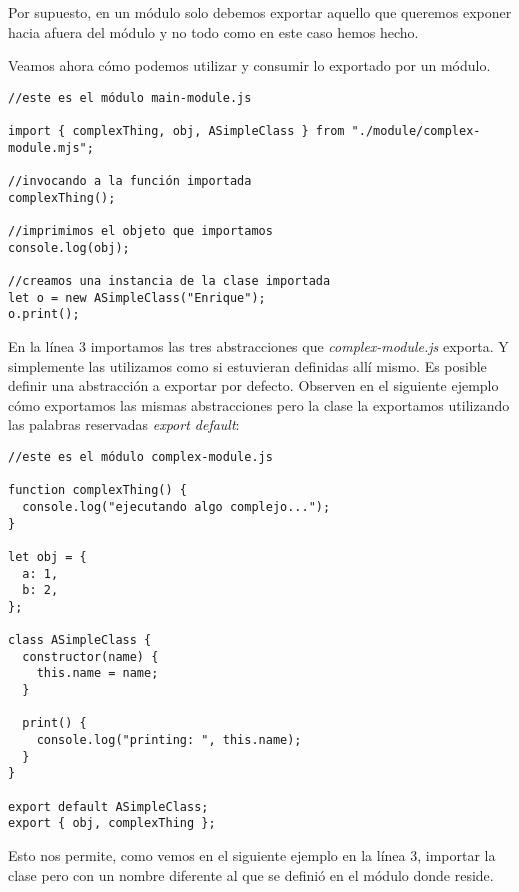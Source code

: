 \documentclass[a4paper, oneside, titlepage, 12pt]{paper}
\begin{document}
Por supuesto, en un módulo solo debemos exportar aquello que queremos exponer hacia afuera del módulo y no todo como en este caso hemos hecho. 	
\newline

Veamos ahora cómo podemos utilizar y consumir lo exportado por un módulo.

\begin{verbatim}
//este es el módulo main-module.js

import { complexThing, obj, ASimpleClass } from "./module/complex-module.mjs";

//invocando a la función importada
complexThing();

//imprimimos el objeto que importamos
console.log(obj);

//creamos una instancia de la clase importada
let o = new ASimpleClass("Enrique");
o.print();
\end{verbatim}

En la línea 3 importamos las tres abstracciones que \textit{complex-module.js} exporta. Y simplemente las utilizamos como si estuvieran definidas allí mismo. Es posible definir una abstracción a exportar por defecto. Observen en el siguiente ejemplo cómo exportamos las mismas abstracciones pero la clase la exportamos utilizando las palabras reservadas \textit{export default}:

\begin{verbatim}
//este es el módulo complex-module.js

function complexThing() {
  console.log("ejecutando algo complejo...");
}

let obj = {
  a: 1,
  b: 2,
};

class ASimpleClass {
  constructor(name) {
    this.name = name;
  }

  print() {
    console.log("printing: ", this.name);
  }
}

export default ASimpleClass;
export { obj, complexThing };
\end{verbatim}

Esto nos permite, como vemos en el siguiente ejemplo en la línea 3, importar la clase pero con un nombre diferente al que se definió en el módulo donde reside.
\end{document}
